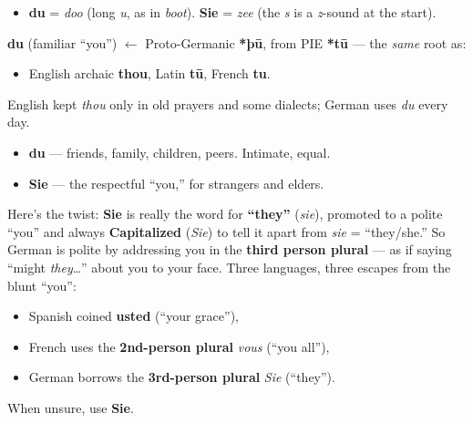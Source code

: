 \begin{sounds}
\begin{itemize}
\raggedright
  \item \textbf{du} = \emph{doo} (long \emph{u}, as in \emph{boot}). \textbf{Sie} = \emph{zee} (the \emph{s} is a \emph{z}-sound at the start).
\end{itemize}
\end{sounds}

\begin{cousinweb}
\textbf{du} (familiar \textquotedblleft{}you\textquotedblright{}) $\leftarrow$ Proto-Germanic \textbf{*þū}, from PIE \textbf{*tū} — the \emph{same} root as:

\begin{itemize}
\raggedright
  \item English archaic \textbf{thou}, Latin \textbf{tū}, French \textbf{tu}.
\end{itemize}

English kept \emph{thou} only in old prayers and some dialects; German uses \emph{du} every day.
\end{cousinweb}

\begin{grammarlens}[title={Grammar Lens: two \textquotedblleft{}you\textquotedblright{}s — and German's is the odd one out}]
\begin{itemize}
\raggedright
  \item \textbf{du} — friends, family, children, peers. Intimate, equal.
  \item \textbf{Sie} — the respectful \textquotedblleft{}you,\textquotedblright{} for strangers and elders.
\end{itemize}

Here's the twist: \textbf{Sie} is really the word for \textbf{\textquotedblleft{}they\textquotedblright{}} (\emph{sie}), promoted to a polite \textquotedblleft{}you\textquotedblright{} and always \textbf{Capitalized} (\emph{Sie}) to tell it apart from \emph{sie} = \textquotedblleft{}they/she.\textquotedblright{} So German is polite by addressing you in the \textbf{third person plural} — as if saying \textquotedblleft{}might \emph{they}…\textquotedblright{} about you to your face. Three languages, three escapes from the blunt \textquotedblleft{}you\textquotedblright{}:

\begin{itemize}
\raggedright
  \item Spanish coined \textbf{usted} (\textquotedblleft{}your grace\textquotedblright{}),
  \item French uses the \textbf{2nd-person plural} \emph{vous} (\textquotedblleft{}you all\textquotedblright{}),
  \item German borrows the \textbf{3rd-person plural} \emph{Sie} (\textquotedblleft{}they\textquotedblright{}).
\end{itemize}

When unsure, use \textbf{Sie}.
\end{grammarlens}

